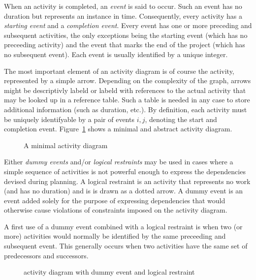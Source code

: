 When an activity is completed, an \emph{event} is said to occur. Such an event has no 
duration but represents an instance in time. Consequently, every activity has a \emph{starting
event} and a \emph{completion event}. Every event has one or more preceding and subsequent
activities, the only exceptions being the starting event (which has no preceeding activity) and the
event that marks the end of the project (which has no subsequent event). Each event is usually
identified by a unique integer.

The most important element of an activity diagram is of course the activity, represented by a simple
arrow. Depending on the complexity of the graph, arrows might be descriptivly labeld or labeld with
references to the actual activity that may be looked up in a reference table. Such a table is needed
in any case to store additional information (such as duration, etc.). By definition, each activity
must be uniquely identifyable by a pair of events $i,j$, denoting the start and completion event.
Figure~\ref{pic:activity_diagram_intro} shows a minimal and abstract activity diagram.
\begin{figure}[h]
\centerline{}
\caption{A minimal activity diagram}
\label{pic:activity_diagram_intro}
\end{figure}

Either \emph{dummy events} and/or \emph{logical restraints} may be used in cases where a simple
sequence of activities is not powerful enough to express the dependencies devised during planning. A
logical restraint is an activity that represents no work (and has no duration) and is is drawn as a
dotted arrow. A dummy event is an event added solely for the purpose of expressing dependencies that
would otherwise cause violations of constraints imposed on the activity diagram.

A first use of a dummy event combined with a logical restraint is when two (or more) activities
would normally be identified by the same preceeding and subsequent event. This generally occurs when
two activities have the same set of predecessors and successors.
\begin{figure}[h]
\centerline{}
\caption{activity diagram with dummy event and logical restraint}
\label{pic:activity_diagram_one}
\end{figure}


